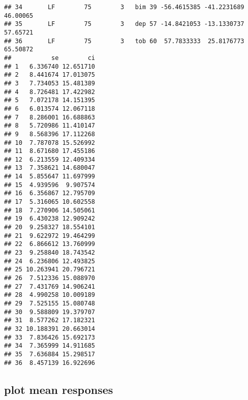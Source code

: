 \documentclass[
]{article}
\begin{document}
\begin{verbatim}
## 34       LF        75        3   bim 39 -56.4615385 -41.2231689 46.00065
## 35       LF        75        3   dep 57 -14.8421053 -13.1330737 57.65721
## 36       LF        75        3   tob 60  57.7833333  25.8176773 65.50872
##           se        ci
## 1   6.336740 12.651710
## 2   8.441674 17.013075
## 3   7.734053 15.481389
## 4   8.726481 17.422982
## 5   7.072178 14.151395
## 6   6.013574 12.067118
## 7   8.286001 16.688863
## 8   5.720986 11.410147
## 9   8.568396 17.112268
## 10  7.787078 15.526992
## 11  8.671680 17.455186
## 12  6.213559 12.409334
## 13  7.358621 14.680047
## 14  5.855647 11.697999
## 15  4.939596  9.907574
## 16  6.356867 12.795709
## 17  5.316065 10.602558
## 18  7.270906 14.505061
## 19  6.430238 12.909242
## 20  9.258327 18.554101
## 21  9.622972 19.464299
## 22  6.866612 13.760999
## 23  9.258840 18.743542
## 24  6.236806 12.493825
## 25 10.263941 20.796721
## 26  7.512336 15.088970
## 27  7.431769 14.906241
## 28  4.990258 10.009189
## 29  7.525155 15.080748
## 30  9.588809 19.379707
## 31  8.577262 17.182321
## 32 10.188391 20.663014
## 33  7.836426 15.692173
## 34  7.365999 14.911685
## 35  7.636884 15.298517
## 36  8.457139 16.922696
\end{verbatim}

\hypertarget{plot-mean-responses}{%
\subsection{plot mean responses}\label{plot-mean-responses}}
\end{document}
